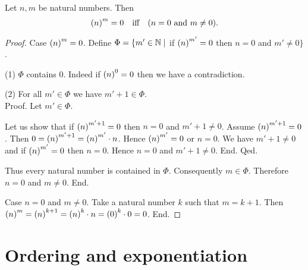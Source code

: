 \documentclass[../arithmetic.tex]{subfiles}
\begin{document}
  \begin{forthel}
    \begin{proposition}
      Let $n, m$ be natural numbers.
      Then \[ \left(n\right)^{m} = 0 \quad \text{iff} \quad (\text{$n = 0$ and $m \neq 0$}). \]
    \end{proposition}
    \begin{proof}
      Case $\left(n\right)^{m} = 0$.
        Define $\Phi = \{ m' \in \mathbb{N} \mid$ if $\left(n\right)^{m'} = 0$ then $n = 0$ and
        $m' \neq 0 \}$.

        (1) $\Phi$ contains $0$.
        Indeed if $\left(n\right)^{0} = 0$ then we have a contradiction.

        (2) For all $m' \in \Phi$ we have $m' \plus 1 \in \Phi$. \\
        Proof.
          Let $m' \in \Phi$.

          Let us show that if $\left(n\right)^{m' + 1} = 0$ then $n = 0$ and $m' \plus 1 \neq 0$.
            Assume $\left(n\right)^{m' + 1} = 0$.
            Then $0 = \left(n\right)^{m' + 1} = \left(n\right)^{m'} \cdot n$.
            Hence $\left(n\right)^{m'} = 0$ or $n = 0$.
            We have $m' \plus 1 \neq 0$ and if $\left(n\right)^{m'} = 0$ then $n = 0$.
            Hence $n = 0$ and $m' \plus 1 \neq 0$.
          End.
        Qed.

        Thus every natural number is contained in $\Phi$.
        Consequently $m \in \Phi$.
        Therefore $n = 0$ and $m \neq 0$.
      End.

      Case $n = 0$ and $m \neq 0$.
        Take a natural number $k$ such that $m = k \plus 1$.
        Then $\left(n\right)^{m}
          = \left(n\right)^{k + 1}
          = \left(n\right)^{k} \cdot n
          = \left(0\right)^{k} \cdot 0
          = 0$.
      End.
    \end{proof}
  \end{forthel}


  \section{Ordering and exponentiation}
\end{document}
